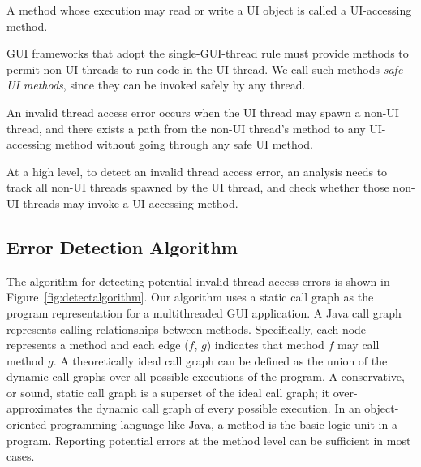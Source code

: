  { A method
whose execution may read or write a UI object is called a UI-accessing method.}\vspace{1mm}

 {GUI frameworks that
adopt the single-GUI-thread rule must provide methods to permit non-UI threads
to run code in the UI thread. We call such methods \textit{safe UI methods}, since
they can be invoked safely by any thread.}\vspace{1mm}

 {An invalid
thread access error occurs when the UI thread may spawn a non-UI thread, and there
exists a path from the non-UI thread's  method to any UI-accessing method
without going through any safe UI method. }\vspace{2mm}

At a high level, to detect an invalid thread access error, an analysis needs to track all
non-UI threads spawned by the UI thread, and check whether those non-UI threads
may invoke a UI-accessing method.

\subsection{Error Detection Algorithm}

The algorithm for detecting potential invalid thread access errors
is shown in Figure~\ref{fig:detectalgorithm}. Our algorithm uses a
static call graph as the program representation for a multithreaded
GUI application. A Java call graph represents calling relationships
between methods. Specifically, each node represents a method and each
edge ($f$, $g$) indicates that method $f$ may call method $g$.
A theoretically ideal call graph can be defined as the union of the
dynamic call graphs over all possible executions of the program. 
A conservative, or sound, static call graph is a superset of
the ideal call graph; it over-approximates the
dynamic call graph of every possible execution. 
In an object-oriented programming language like
Java, a method is the basic logic unit in a program. Reporting
potential errors at the method level can be sufficient in most cases.


